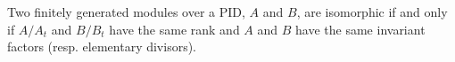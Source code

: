 Two finitely generated modules over a PID, $A$ and $B$, are isomorphic if and only if $A/A_t$ and $B/B_t$ have the same rank and $A$ and $B$ have the same invariant factors (resp. elementary divisors).
